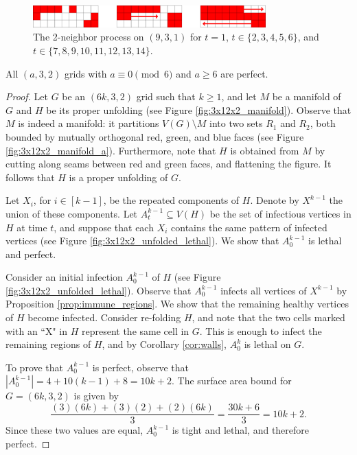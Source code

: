 \begin{figure}[]
\centering
\includegraphics[width=0.8\textwidth]{figures/7/3x9x1.pdf}
\caption{The 2-neighbor process on $(9,3,1)$ for $t=1$, $t \in \{2,3,4,5,6\}$, and $t \in \{7,8,9,10,11,12,13,14\}$.}
\label{fig:9x3x1}
\end{figure} 

\begin{con}
All $(a,3,2)$ grids with $a \equiv 0 \pmod 6$ and $a \geq 6$ are perfect. 
\end{con}

\begin{proof}
Let $G$ be an $(6k,3,2)$ grid such that $k \geq 1$, and let $M$ be a manifold of $G$ and $H$ be its proper unfolding (see Figure \ref{fig:3x12x2_manifold}). Observe that $M$ is indeed a manifold: it partitions $V(G) \setminus M$ into two sets $R_1$ and $R_2$, both bounded by mutually orthogonal red, green, and blue faces (see Figure \ref{fig:3x12x2_manifold_a}). Furthermore, note that $H$ is obtained from $M$ by cutting along seams between red and green faces, and flattening the figure. It follows that $H$ is a proper unfolding of $G$. 

Let $X_i$, for $i \in [k - 1]$, be the repeated components of $H$. Denote by $X^{k-1}$ the union of these components. Let $A_t^{k-1} \subseteq V(H)$ be the set of infectious vertices in $H$ at time $t$, and suppose that each $X_i$ contains the same pattern of infected vertices (see Figure \ref{fig:3x12x2_unfolded_lethal}). We show that $A_0^{k-1}$ is lethal and perfect.

Consider an initial infection $A_0^{k-1}$ of $H$ (see Figure \ref{fig:3x12x2_unfolded_lethal}). Observe that $A_0^{k-1}$ infects all vertices of $X^{k-1}$ by Proposition \ref{prop:immune_regions}. We show that the remaining healthy vertices of $H$ become infected. Consider re-folding $H$, and note that the two cells marked with an ``X" in $H$ represent the same cell in $G$. This is enough to infect the remaining regions of $H$, and by Corollary \ref{cor:walls}, $A_0^k$ is lethal on $G$. 

To prove that $A_0^{k-1}$ is perfect, observe that $|A_0^{k-1}| = 4 + 10(k-1) + 8 = 10k +2$. The surface area bound for $G=(6k,3,2)$ is given by
$$\frac{(3)(6k) + (3)(2) + (2)(6k)}{3} = \frac{30k + 6}{3} = 10k+2.$$
Since these two values are equal, $A_0^{k-1}$ is tight and lethal, and therefore perfect.
\end{proof}

